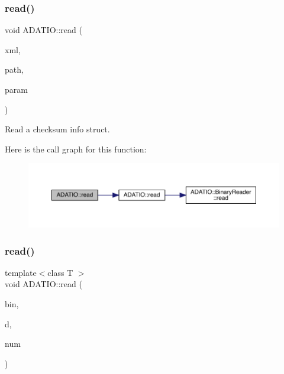 \subsubsection{\texorpdfstring{read()}{read()}\hspace{0.1cm}{\footnotesize\ttfamily [17/28]}}
{\footnotesize\ttfamily void A\+D\+A\+T\+I\+O\+::read (\begin{DoxyParamCaption}\item[{\mbox{\hyperlink{classADATXML_1_1XMLReader}{X\+M\+L\+Reader}} \&}]{xml,  }\item[{const std\+::string \&}]{path,  }\item[{\mbox{\hyperlink{structADATIO_1_1QIOChecksumInfo__t}{Q\+I\+O\+Checksum\+Info\+\_\+t}} \&}]{param }\end{DoxyParamCaption})}



Read a checksum info struct. 

Here is the call graph for this function\+:\nopagebreak
\begin{figure}[H]
\begin{center}
\leavevmode
\includegraphics[width=350pt]{d0/dba/namespaceADATIO_ab39e59b5ba8a584a1c5afd164173b9e7_cgraph}
\end{center}
\end{figure}
\mbox{\label{namespaceADATIO_a2a2a1e3d909d72f5e64dcded1bdb8012}} 
\subsubsection{\texorpdfstring{read()}{read()}\hspace{0.1cm}{\footnotesize\ttfamily [18/28]}}
{\footnotesize\ttfamily template$<$class T $>$ \\
void A\+D\+A\+T\+I\+O\+::read (\begin{DoxyParamCaption}\item[{\mbox{\hyperlink{classADATIO_1_1BinaryReader}{Binary\+Reader}} \&}]{bin,  }\item[{\mbox{\hyperlink{classXMLArray_1_1Array}{X\+M\+L\+Array\+::\+Array}}$<$ T $>$ \&}]{d,  }\item[{int}]{num }\end{DoxyParamCaption})\hspace{0.3cm}{\ttfamily [inline]}}



